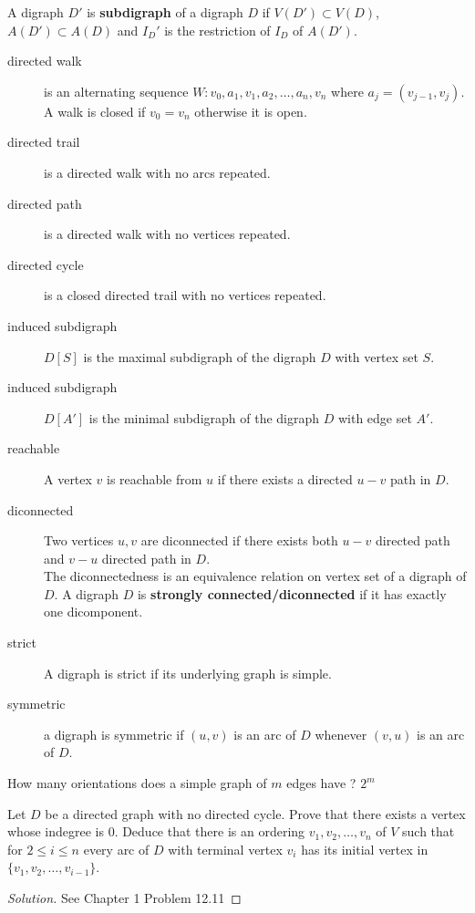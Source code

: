 \begin{definition}
	A digraph $D'$ is \textbf{subdigraph} of a digraph $D$ if $V(D') \subset V(D)$, $A(D') \subset A(D)$ and $I_D'$ is the restriction of $I_D$ of $A(D')$.
\end{definition}

\begin{description}
	\item[directed walk] is an alternating sequence $W : v_0,a_1,v_1,a_2,\dots,a_n,v_n$ where $a_j = (v_{j-1},v_j)$.
	A walk is closed if $v_0 = v_n$ otherwise it is open.
	\item[directed trail] is a directed walk with no arcs repeated.
	\item[directed path] is a directed walk with no vertices repeated.
	\item[directed cycle] is a closed directed trail with no vertices repeated.
	\item[induced subdigraph] $D[S]$ is the maximal subdigraph of the digraph $D$ with vertex set $S$.
	\item[induced subdigraph] $D[A']$ is the minimal subdigraph of the digraph $D$ with edge set $A'$.
	\item[reachable] A vertex $v$ is reachable from $u$ if there exists a directed $u-v$ path in $D$.
	\item[diconnected] Two vertices $u,v$ are diconnected if there exists both $u-v$ directed path and $v-u$ directed path in $D$.\\

		The diconnectedness is an equivalence relation on vertex set of a digraph of $D$. A digraph $D$ is \textbf{strongly connected/diconnected} if it has exactly one dicomponent.
	\item[strict] A digraph is strict if its underlying graph is simple.
	\item[symmetric] a digraph is symmetric if $(u,v)$ is an arc of $D$ whenever $(v,u)$ is an arc of $D$.
\end{description}

\begin{exercise} How many orientations does a simple graph of $m$ edges have ? $2^m$
\end{exercise}

\begin{exercise} Let $D$ be a directed graph with no directed cycle. Prove that there exists a vertex whose indegree is $0$. Deduce that there is an ordering $v_1,v_2,\dots,v_n$ of $V$ such that for $2 \le i \le n$ every arc of $D$ with terminal vertex $v_i$ has its initial vertex in $\{v_1,v_2,\dots,v_{i-1}\}$.
\end{exercise}
\begin{proof}[Solution]
	See Chapter 1 Problem 12.11
\end{proof}


